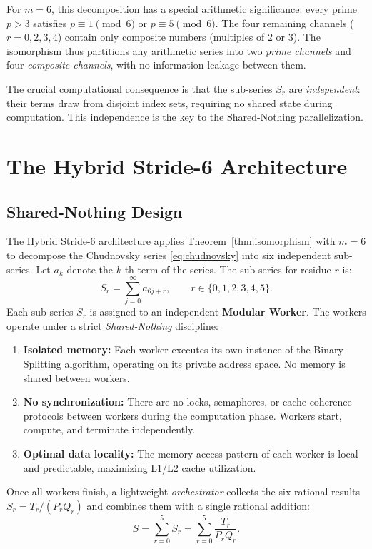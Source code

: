 \documentclass[12pt,a4paper]{article}
\theoremstyle{plain}
\theoremstyle{definition}
\theoremstyle{remark}
\begin{document}
For \(m=6\), this decomposition has a special arithmetic significance: every prime \(p>3\) satisfies \(p \equiv 1 \pmod{6}\) or \(p \equiv 5 \pmod{6}\). The four remaining channels (\(r=0,2,3,4\)) contain only composite numbers (multiples of 2 or 3). The isomorphism thus partitions any arithmetic series into two \emph{prime channels} and four \emph{composite channels}, with no information leakage between them.

The crucial computational consequence is that the sub-series \(S_r\) are \emph{independent}: their terms draw from disjoint index sets, requiring no shared state during computation. This independence is the key to the Shared-Nothing parallelization.

\section{The Hybrid Stride-6 Architecture}
\label{sec:architecture}

\subsection{Shared-Nothing Design}
The Hybrid Stride-6 architecture applies Theorem~\ref{thm:isomorphism} with \(m=6\) to decompose the Chudnovsky series \eqref{eq:chudnovsky} into six independent sub-series. Let \(a_k\) denote the \(k\)-th term of the series. The sub-series for residue \(r\) is:
\begin{equation}
S_r = \sum_{j=0}^{\infty} a_{6j + r}, \qquad r \in \{0,1,2,3,4,5\}.
\label{eq:subseries}
\end{equation}
Each sub-series \(S_r\) is assigned to an independent \textbf{Modular Worker}. The workers operate under a strict \emph{Shared-Nothing} discipline:
\begin{enumerate}[label=(\roman*)]
    \item \textbf{Isolated memory:} Each worker executes its own instance of the Binary Splitting algorithm, operating on its private address space. No memory is shared between workers.
    \item \textbf{No synchronization:} There are no locks, semaphores, or cache coherence protocols between workers during the computation phase. Workers start, compute, and terminate independently.
    \item \textbf{Optimal data locality:} The memory access pattern of each worker is local and predictable, maximizing L1/L2 cache utilization.
\end{enumerate}
Once all workers finish, a lightweight \emph{orchestrator} collects the six rational results \(S_r = T_r / (P_r Q_r)\) and combines them with a single rational addition:
\begin{equation}
S = \sum_{r=0}^{5} S_r = \sum_{r=0}^{5} \frac{T_r}{P_r Q_r}.
\label{eq:recombination}
\end{equation}
\end{document}

